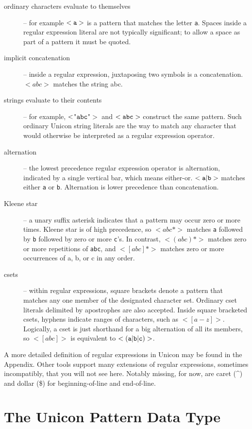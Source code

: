 \documentclass[letterpaper,12pt]{article}
\begin{document}
\begin{description}
\item [ordinary characters evaluate to themselves] -- for example
${\tt <a>}$ is a pattern that matches the letter {\tt a}.  Spaces
inside a regular expression literal are not typically significant;
to allow a space as part of a pattern it must be quoted.
\item [implicit concatenation] -- inside a regular expression,
juxtaposing two symbols is a concatenation. $<abc>$ matches the
string abc.
\item [strings evaluate to their contents] -- for example,
${\tt <}${\ttfamily"}${\tt abc}${\ttfamily"}$>$ and ${\tt <abc>}$
construct the same
pattern. Such ordinary Unicon string literals are the way to match any
character that would otherwise be interpreted as a regular
expression operator.
\item [alternation] -- the lowest precedence regular expression
operator is alternation, indicated by a single vertical bar, which
means either-or. ${\tt <a\vert b>}$ matches either {\tt a} or {\tt b}.
Alternation is lower precedence than concatenation.
\item [Kleene star] -- a unary suffix asterisk indicates that a
pattern may occur zero or more times. Kleene star is of high
precedence, so {\tt $<abc*>$} matches {\tt a} followed by {\tt b}
followed by zero or more {\tt c}'s. In contrast, {\tt $<(abc)*>$}
matches zero or more repetitions of {\tt abc}, and {\tt $<[abc]*>$}
matches zero or more occurrences of a, b, or c in any order.
\item [csets] -- within regular expressions, square brackets denote
a pattern that matches any one member of the designated character
set. Ordinary cset literals delimited by apostrophes are also accepted.
Inside square bracketed csets,
hyphens indicate ranges of characters, such as {\tt $<[a-z]>$}.  Logically,
a cset is just shorthand for a big alternation of all its members, so
{\tt $<[abc]>$} is equivalent to ${\tt <(a\vert b\vert c)>}$.

\end{description}

A more detailed definition of regular expressions in Unicon may be found
in the Appendix.  Other tools support many extensions of regular
expressions, sometimes incompatibly, that you will not see
here. Notably missing, for now, are caret (\^{}) and dollar (\$) for
beginning-of-line and end-of-line.


\section{The Unicon Pattern Data Type }
\end{document}
